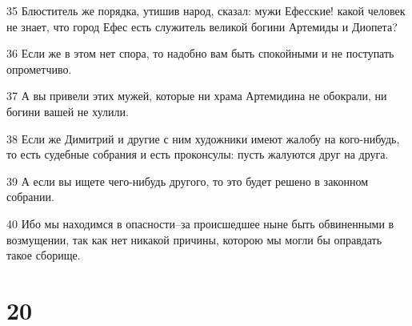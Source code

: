 \par 35 Блюститель же порядка, утишив народ, сказал: мужи Ефесские! какой человек не знает, что город Ефес есть служитель великой богини Артемиды и Диопета?
\par 36 Если же в этом нет спора, то надобно вам быть спокойными и не поступать опрометчиво.
\par 37 А вы привели этих мужей, которые ни храма Артемидина не обокрали, ни богини вашей не хулили.
\par 38 Если же Димитрий и другие с ним художники имеют жалобу на кого-нибудь, то есть судебные собрания и есть проконсулы: пусть жалуются друг на друга.
\par 39 А если вы ищете чего-нибудь другого, то это будет решено в законном собрании.
\par 40 Ибо мы находимся в опасности--за происшедшее ныне быть обвиненными в возмущении, так как нет никакой причины, которою мы могли бы оправдать такое сборище.

\chapter{20}

